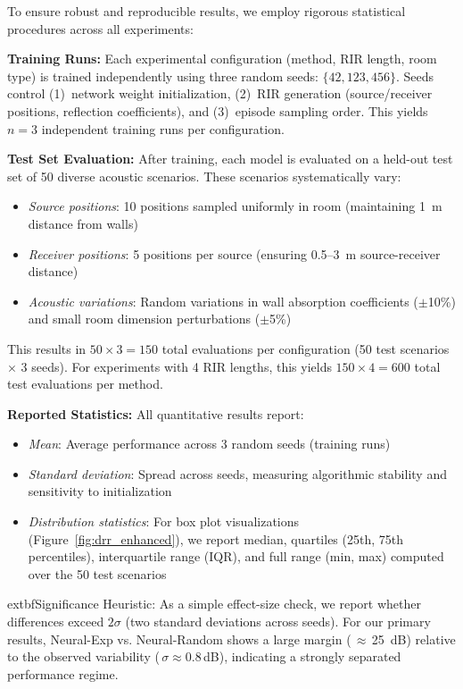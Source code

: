 \documentclass[12pt,a4paper]{article}
\begin{document}
To ensure robust and reproducible results, we employ rigorous statistical procedures across all experiments:

\textbf{Training Runs:} Each experimental configuration (method, RIR length, room type) is trained independently using three random seeds: $\{42, 123, 456\}$. Seeds control (1)~network weight initialization, (2)~RIR generation (source/receiver positions, reflection coefficients), and (3)~episode sampling order. This yields $n=3$ independent training runs per configuration.

\textbf{Test Set Evaluation:} After training, each model is evaluated on a held-out test set of 50 diverse acoustic scenarios. These scenarios systematically vary:
\begin{itemize}
\item \textit{Source positions}: 10 positions sampled uniformly in room (maintaining 1~m distance from walls)
\item \textit{Receiver positions}: 5 positions per source (ensuring 0.5--3~m source-receiver distance)
\item \textit{Acoustic variations}: Random variations in wall absorption coefficients ($\pm$10\%) and small room dimension perturbations ($\pm$5\%)
\end{itemize}

This results in $50 \times 3 = 150$ total evaluations per configuration (50 test scenarios $\times$ 3 seeds). For experiments with 4 RIR lengths, this yields $150 \times 4 = 600$ total test evaluations per method.

\textbf{Reported Statistics:} All quantitative results report:
\begin{itemize}
\item \textit{Mean}: Average performance across 3 random seeds (training runs)
\item \textit{Standard deviation}: Spread across seeds, measuring algorithmic stability and sensitivity to initialization
\item \textit{Distribution statistics}: For box plot visualizations (Figure~\ref{fig:drr_enhanced}), we report median, quartiles (25th, 75th percentiles), interquartile range (IQR), and full range (min, max) computed over the 50 test scenarios
\end{itemize}

            extbf{Significance Heuristic:} As a simple effect-size check, we report whether differences exceed $2\sigma$ (two standard deviations across seeds). For our primary results, Neural-Exp vs. Neural-Random shows a large margin (\,$\approx$\,25~dB) relative to the observed variability (\,$\sigma \approx 0.8$\,dB), indicating a strongly separated performance regime.
\end{document}
